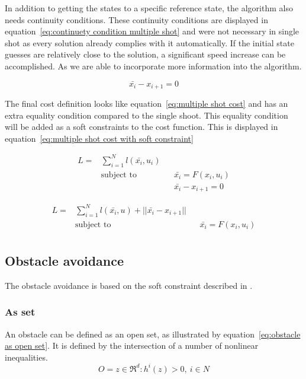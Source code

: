 			In addition to getting the states to a specific reference state, the algorithm also needs continuity conditions. These continuity conditions are displayed in equation~\ref{eq:continuety condition multiple shot} and were not necessary in single shot as every solution already complies with it automatically. If the initial state guesses are relatively close to the solution, a significant speed increase can be accomplished. As we are able to incorporate more information into the algorithm.
			
			\begin{equation}
				\bar{x_i} - x_{i+1} = 0
				\label{eq:continuety condition multiple shot}
			\end{equation}
			
			The final cost definition looks like equation~\ref{eq:multiple shot cost} and has an extra equality condition compared to the single shoot. This equality condition will be added as a soft constraints to the cost function. This is displayed in equation~\ref{eq:multiple shot cost with soft constraint}
			
			\begin{equation}
				\begin{aligned}
				L =  & \sum_{i=1}^{N} l(\bar{x_i},u_i) \\
				& \text{subject to}			&& \bar{x_i} = F(x_i,u_i) \\
				& 							&& \bar{x_i} - x_{i+1} = 0
				\end{aligned}
				\label{eq:multiple shot cost}
			\end{equation}
			
			\begin{equation}
			\begin{aligned}
			L =  & \sum_{i=1}^{N} l(\bar{x_i},u) + ||\bar{x_i} - x_{i+1}||\\
			& \text{subject to}			&& \bar{x_i} = F(x_i,u_i) \\
			\end{aligned}
			\label{eq:multiple shot cost with soft constraint}
			\end{equation}
			
		\subsection{Obstacle avoidance}
			The obstacle avoidance is based on the soft constraint described in \cite{AjaySathya2017}.
			\subsubsection{As set}
				An obstacle can be defined as an open set, as illustrated by equation~\ref{eq:obstacle as open set}. It is defined by the intersection of a number of nonlinear inequalities.
				\begin{equation}
					O = {z \in \Re^d : h^i(z)>0,\ i \in N}
					\label{eq:obstacle as open set}
				\end{equation}
				
